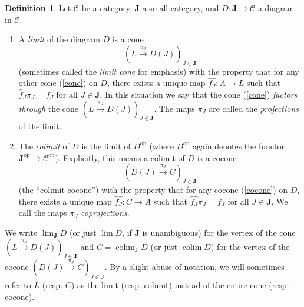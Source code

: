\documentclass[10pt,oneside]{book}
\def\~#1{\mathscr{#1}}
\def\To#1{\xrightarrow{#1}}
\newcommand{\op}{\mathrm{op}}
\newcommand{\colim}{\mathop{\mathrm{colim}}}
\theoremstyle{plain}
\theoremstyle{definition}
\newtheorem{defn}[thm]{Definition}
\theoremstyle{remark}
\numberwithin{equation}{section}
\numberwithin{figure}{section}
\begin{document}
\begin{defn}
Let $\~C$ be a category, $\mathbf{J}$ a small category, and $D: \mathbf{J} \to \~C$ a diagram in $\~C$.
\begin{enumerate}[label=(\roman*)]
\item A \emph{limit} of the diagram $D$ is a cone 
\[
\left(L \To{\pi_J} D(J)\right)_{J \in \mathbf{J}}
\]
(sometimes called the \emph{limit cone} for emphasis) with the property that for any other cone (\ref{cone}) on $D$, there exists a unique map $\hat{f_J}: A \to L$ such that $\hat{f}_J \pi_J = f_J$ for all $J \in \mathbf{J}$. In this situation we say that the cone (\ref{cone}) \emph{factors through} the cone $\left(L \To{\pi_J} D(J)\right)_{J \in \mathbf{J}}$. The maps $\pi_J$ are called the \emph{projections} of the limit. 

\item The \emph{colimit} of $D$ is the limit of $D^\op$ (where $D^\op$ again denotes the functor $\mathbf{J}^\op \to \~C^\op$). Explicitly, this means a colimit of $D$ is a cocone
\[\left(D(J) \To{\pi_J} C \right)_{J \in \mathbf{J}}\]
(the ``colimit cocone'') with the property that for any cocone (\ref{cocone}) on $D$, there exists a unique map $\hat{f_J}: C \to A$ such that $\hat{f_J} \pi_J = f_J$ for all $J \in \mathbf{J}$. We call the maps $\pi_J$ \emph{coprojections}.
\end{enumerate}
We write $\lim_{\mathbf{J}} D$ (or just $\lim D$, if $\mathbf{J}$ is unambiguous) for the vertex of the cone $\left(L \To{\pi_J} D(J)\right)_{J \in \mathbf{J}}$ and $C = \colim_{\mathbf{J}} D$ (or just $\colim D$) for the vertex of the cocone $\left(D(J) \To{\pi_J} C \right)_{J \in \mathbf{J}}$. By a slight abuse of notation, we will sometimes refer to $L$ (resp. $C$) as the limit (resp. colimit) instead of the entire cone (resp. cocone).
\end{defn}
\end{document}
